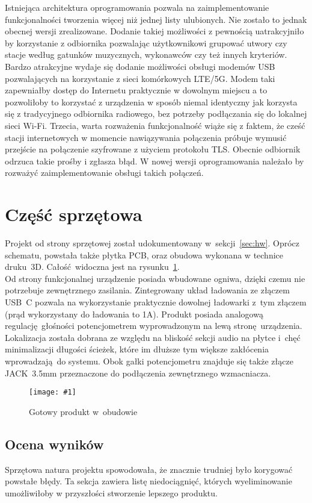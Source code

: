 \documentclass[polish]{aghengthesis}
\newcommand{\imgint}[4]{
	\begin{figure}[{#4}]
		\centering
		\texttt{[image: \#1]}
		\caption{#2}
		\label{#1}
	\end{figure}
}
\newcommand{\imgh}[3]{\imgint{#1}{#2}{#3}{H}}
\begin{document}
			Istniejąca architektura oprogramowania pozwala na zaimplementowanie funkcjonalności tworzenia więcej niż jednej listy ulubionych. Nie zostało to jednak obecnej wersji zrealizowane. Dodanie takiej możliwości z pewnością uatrakcyjniło by korzystanie z odbiornika pozwalając użytkownikowi grupować utwory czy stacje według gatunków muzycznych, wykonawców czy też innych kryteriów.
			Bardzo atrakcyjne wydaje się dodanie możliwości obsługi modemów USB pozwalających na korzystanie z sieci komórkowych LTE/5G. Modem taki zapewniałby dostęp do Internetu praktycznie w dowolnym miejscu a to pozwoliłoby to korzystać z urządzenia w sposób niemal identyczny jak korzysta się z tradycyjnego odbiornika radiowego, bez potrzeby podłączania się do lokalnej sieci Wi-Fi. Trzecia, warta rozważenia funkcjonalność wiąże się z faktem, że cześć stacji internetowych w momencie nawiązywania połączenia próbuje wymusić przejście na połączenie szyfrowane z użyciem protokołu TLS. Obecnie odbiornik odrzuca takie prośby i zgłasza błąd. W nowej wersji oprogramowania należało by rozważyć zaimplementowanie obsługi takich połączeń. 
			
	\section{Część sprzętowa}
		Projekt od strony sprzętowej został udokumentowany w~sekcji~\ref{sec:hw}. Oprócz schematu, powstała także płytka PCB, oraz obudowa wykonana w technice druku~3D. Całość widoczna jest na rysunku~\ref{5/hw_result}.
		$ $\\
		
		Od strony funkcjonalnej urządzenie posiada wbudowane ogniwa, dzięki czemu nie potrzebuje zewnętrznego zasilania. Zintegrowany układ ładowania ze złączem USB~C pozwala na wykorzystanie praktycznie dowolnej ładowarki z~tym złączem (prąd wykorzystany do ładowania to 1A). Produkt posiada analogową regulację głośności potencjometrem wyprowadzonym na lewą stronę urządzenia. Lokalizacja została dobrana ze względu na bliskość sekcji audio na płytce i~chęć minimalizacji długości ścieżek, które im dłuższe tym większe zakłócenia wprowadzają do systemu. Obok gałki potencjometru znajduje się także złącze JACK~3.5mm przeznaczone do podłączenia zewnętrznego wzmacniacza.
		
		\imgh{5/hw_result}{Gotowy produkt w~obudowie}{0.7}
		
		\subsection{Ocena wyników}
			Sprzętowa natura projektu spowodowała, że znacznie trudniej było korygować powstałe błędy.
			Ta sekcja zawiera listę niedociągnięć, których wyeliminowanie umożliwiłoby w przyszłości stworzenie lepszego produktu.
\end{document}
